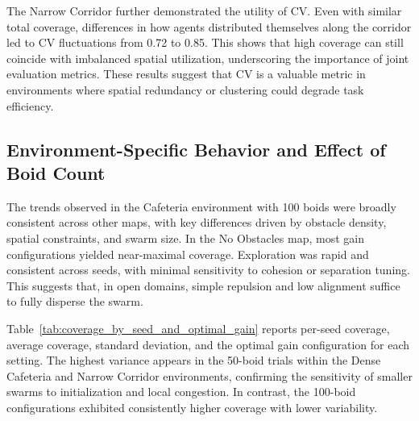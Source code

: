 \documentclass[12pt]{article}
\begin{document}
The Narrow Corridor further demonstrated the utility of CV. Even with similar total coverage, differences in how agents distributed themselves along the corridor led to CV fluctuations from 0.72 to 0.85. This shows that high coverage can still coincide with imbalanced spatial utilization, underscoring the importance of joint evaluation metrics. These results suggest that CV is a valuable metric in environments where spatial redundancy or clustering could degrade task efficiency.

\subsection{Environment-Specific Behavior and Effect of Boid Count}

The trends observed in the Cafeteria environment with 100 boids were broadly consistent across other maps, with key differences driven by obstacle density, spatial constraints, and swarm size. In the No Obstacles map, most gain configurations yielded near-maximal coverage. Exploration was rapid and consistent across seeds, with minimal sensitivity to cohesion or separation tuning. This suggests that, in open domains, simple repulsion and low alignment suffice to fully disperse the swarm.

Table~\ref{tab:coverage_by_seed_and_optimal_gain} reports per-seed coverage, average coverage, standard deviation, and the optimal gain configuration for each setting. The highest variance appears in the 50-boid trials within the Dense Cafeteria and Narrow Corridor environments, confirming the sensitivity of smaller swarms to initialization and local congestion. In contrast, the 100-boid configurations exhibited consistently higher coverage with lower variability.
\end{document}
